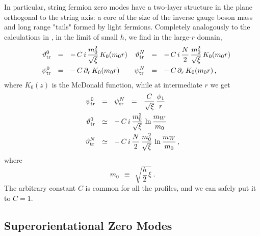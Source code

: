 \documentclass[12pt]{article}
\newcommand{\p}{\partial}
\newcommand{\pts}{\psi_{\rm tr}^0}
\newcommand{\ptN}{\psi_{\rm tr}^N}
\newcommand{\tts}{\vartheta_{\rm tr}^0}
\newcommand{\ttN}{\vartheta_{\rm tr}^N}
\begin{document}
In particular, string fermion zero modes have a two-layer structure in the plane
orthogonal to the string axis: a core of the size of the inverse gauge boson mass and long range
"tails" formed by light fermions.
	Completely analogously to the calculations in \cite{GSYmmodel,BSYhet}, in the limit of 
	small $h$, we find in the large-$r$ domain,
\begin{align*}
%
	&& \tts &~~=~~ -\, C\,i\,\frac{m_0^2}{\sqrt{\xi}}\, K_0(m_0 r) 
	& \ttN & ~~=~~ -\, C\,i\,\frac{N}{2}\,\frac{m_0^2}{\sqrt{\xi}}\,K_0(m_0 r) \\
%
	&& \pts &~~=~~ -\, C\,\p_r\,K_0(m_0 r) 
	& \ptN & ~~=~~ -\, C\,\p_r\,K_0(m_0 r)\,,
\end{align*}
	where $ K_0(z) $ is the McDonald function, 
	while at intermediate $ r $ we get
\begin{align*}
%
	\pts & ~~=~~ \ptN ~~=~~ \frac{C}{\sqrt{\xi}}\,\frac{\phi_1}{r}
	\\
%
	\tts & ~~\simeq~~ -\,C\,i\,\frac{m_0^2}{\sqrt{\xi}}\,\ln\frac{m_W}{m_0}
	\\
%
	\ttN & ~~\simeq~~ -\,C\,i\,\frac{N}{2}\,\frac{m_0^2}{\sqrt{\xi}}\,\ln\frac{m_W}{m_0}\,,
\end{align*}
where 
\[
	m_0 ~~\equiv~~ \sqrt{\frac{h}{2}\, \xi}\,.
\]
	The arbitrary constant $ C $ is common for all the profiles, and we can safely put
	it to $ C = 1 $.


\subsection{Superorientational Zero Modes}
\end{document}
